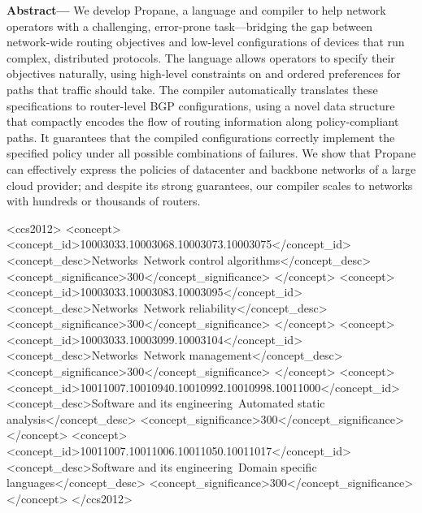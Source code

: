 \documentclass[10pt]{sigalternate052015}
\newcommand{\sysname}{{\small \sf Propane}\xspace}
\begin{document}
\textbf{Abstract---}
We develop \sysname, a language and compiler to help network operators with a challenging, error-prone task---bridging the gap between network-wide routing objectives and low-level configurations of devices that run complex, distributed protocols.
%
The language allows operators to specify their objectives naturally, using high-level constraints on and ordered preferences for paths that traffic should take.
%
The compiler automatically translates these specifications to router-level BGP configurations, using a novel data structure that compactly encodes the flow of routing information along policy-compliant paths.
It guarantees that the compiled configurations correctly implement the specified policy under all possible combinations of failures.
%
We show that \sysname can effectively express the policies of datacenter and backbone networks of a large cloud provider;  and despite its strong guarantees, our compiler scales to networks with hundreds or thousands of routers.



%
%
%
%


\begin{CCSXML}
<ccs2012>
<concept>
<concept_id>10003033.10003068.10003073.10003075</concept_id>
<concept_desc>Networks~Network control algorithms</concept_desc>
<concept_significance>300</concept_significance>
</concept>
<concept>
<concept_id>10003033.10003083.10003095</concept_id>
<concept_desc>Networks~Network reliability</concept_desc>
<concept_significance>300</concept_significance>
</concept>
<concept>
<concept_id>10003033.10003099.10003104</concept_id>
<concept_desc>Networks~Network management</concept_desc>
<concept_significance>300</concept_significance>
</concept>
<concept>
<concept_id>10011007.10010940.10010992.10010998.10011000</concept_id>
<concept_desc>Software and its engineering~Automated static analysis</concept_desc>
<concept_significance>300</concept_significance>
</concept>
<concept>
<concept_id>10011007.10011006.10011050.10011017</concept_id>
<concept_desc>Software and its engineering~Domain specific languages</concept_desc>
<concept_significance>300</concept_significance>
</concept>
</ccs2012>
\end{CCSXML}
\end{document}
